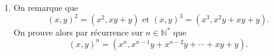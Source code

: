 \documentclass[11pt,a4paper]{article}
\begin{document}
\begin{corrige}
\begin{enumerate}
\begin{itemize}
				\item  Tout élément $(x,y)$ possède un inverse. Expliquons comment le trouver. Il n'est pas très difficile de remarquer qu'il doit s'écrire sous la forme $(1/x,a)$. De
				$$(x,y)\star (1/x,a)=(1,xa+y)$$
				on voit qu'on doit avoir $xa+y=0$ et donc $a=-y/x$. On vérifie alors que $(1/x,-y/x)$ est un inverse de $(x,y)$ : 
				$$(x,y)\star (1/x,-y/x)=(1/x,-y/x)\star (x,y)=(1,0).$$
				
			\end{itemize}
			
			Le groupe n'est pas commutatif. En effet on a 
			$$(1,1)\star (2,1)=(2,2)$$ 
			alors que 
			$$(2,1)\star (1,1)=(2,3).$$
			
			\item  On remarque que 
			$$(x,y)^2=(x^2,xy+y)\textrm{ et }(x,y)^3=(x^3,x^2y+xy+y).$$
			On prouve alors par récurrence sur $n\in\mathbb N^*$ que
			$$(x,y)^n=(x^n,x^{n-1}y+x^{n-2}y+\cdots+xy+y).$$
			
		\end{enumerate}
	\end{corrige}
	
\end{document}
